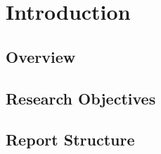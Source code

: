\chapter{Introduction}
\label{ch:intro}

\section{Overview}

\section{Research Objectives}

\section{Report Structure}




